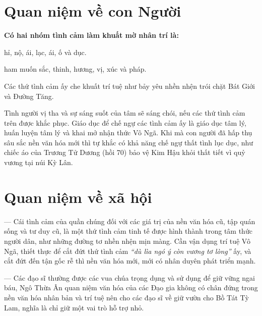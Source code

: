 \section{Quan niệm về con Người} %
\label{sec:72_73_con_nguoi}

{\bf Có hai nhóm tình cảm làm khuất mờ nhân trí là:}

\begin{description}[leftmargin=!,labelwidth=\widthof{\bfseries Thất tình:}]
    \item[Thất tình:] hỉ, nộ, ái, lạc, ái, ố và dục.

    \item[Lục dục:] ham muốn sắc, thinh, hương, vị, xúc và pháp.
\end{description}

Các thứ tình cảm ấy che khuất trí tuệ như bảy yêu nhền nhện trói chặt Bát Giới và Đường Tăng.

Tình người vị tha và sự sáng suốt của tâm sẽ sáng chói, nếu các thứ tình cảm trên được khắc phục. Giáo dục để chế ngự các tình cảm ấy là giáo dục tâm lý, huấn luyện tâm lý và khai mở nhận thức Vô Ngã. Khi mà con người đã hấp thụ sâu sắc nền văn hóa mới thì tự khắc có khả năng chế ngự thất tình lục dục, như chiếc áo của Trương Tử Dương (hồi 70) bảo vệ Kim Hậu khỏi thất tiết vì quỷ vương tại núi Kỳ Lân.

\section{Quan niệm về xã hội} %
\label{sec:72_73_xa_hoi}

— Cái tình cảm của quần chúng đối với các giá trị của nền văn hóa cũ, tập quán sống và tư duy cũ, là một thứ tình cảm tinh tế được hình thành trong tâm thức người dân, như những đường tơ nhền nhện mịn màng. Cần vận dụng trí tuệ Vô Ngã, thiết thực để cắt đứt thứ tình cảm \emph{``dù lìa ngó ý còn vương tơ lòng''} ấy, và cắt đứt đến tận gốc rễ thì nền văn hóa mới, mới có nhân duyên phát triển mạnh.

— Các đạo sĩ thường được các vua chúa trọng dụng và sử dụng để giữ vững ngai báu, Ngô Thừa Ân quan niệm văn hóa của các Đạo gia không có chân đứng trong nền văn hóa nhân bản và trí tuệ nên cho các đạo sĩ về giữ vườn cho Bồ Tát Tỳ Lam, nghĩa là chỉ giữ một vai trò hỗ trợ nhỏ.
